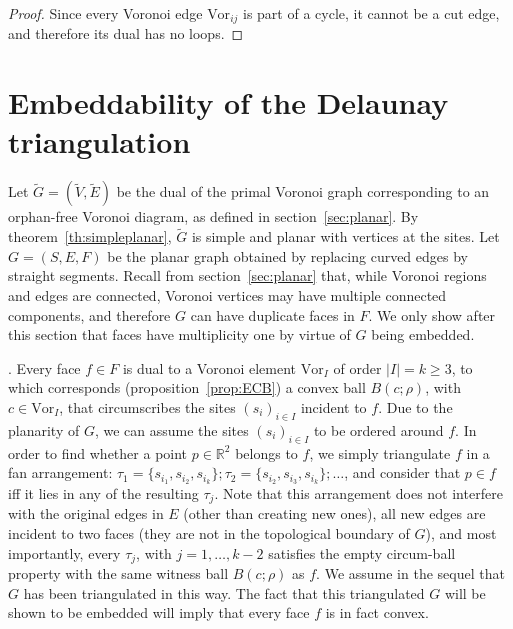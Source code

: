 \documentclass[11pt]{article}
\newcommand{\Sites}{S}
\newcommand{\Vor}{\text{Vor}}
\begin{document}
\begin{proof}
Since every Voronoi edge $\Vor_{ij}$ is part of a cycle, it cannot be a cut edge, and therefore its dual has no loops. 
\end{proof}









\section{Embeddability of the Delaunay triangulation}\label{sec:dual}





Let $\tilde{G}=(\tilde{V}, \tilde{E})$ be the dual of the primal Voronoi graph corresponding to an orphan-free Voronoi diagram, 
	as defined in section~\ref{sec:planar}. 
By theorem~\ref{th:simpleplanar}, $\tilde{G}$ is simple and planar with vertices at the sites. 
Let $G=(\Sites,E,F)$ be the planar graph obtained by replacing curved edges by straight segments. 
Recall from section~\ref{sec:planar} that, 
	while Voronoi regions and edges are connected, Voronoi vertices may have multiple connected components, 
	and therefore $G$ can have duplicate faces in $F$. 
We only show after this section that faces have multiplicity one by virtue of $G$ being embedded. 


\vspace*{0.08in}. 
Every face $f\in F$ is dual to a Voronoi element $\Vor_I$ of order $|I|=k\ge 3$, 
	to which corresponds (proposition~\ref{prop:ECB}) a convex ball $B(c;\rho)$, with $c\in\Vor_I$, 
	that circumscribes the sites $(s_i)_{i\in I}$ incident to $f$. 
Due to the planarity of $G$, we can assume the sites $(s_i)_{i\in I}$ to be ordered around $f$. 
In order to find whether a point $p\in\mathbb{R}^2$ belongs to $f$, 
	we simply triangulate $f$ in a fan arrangement: 
		$\tau_1=\{s_{i_1},s_{i_2},s_{i_k}\}; \tau_2=\{s_{i_2},s_{i_3},s_{i_k}\}; \dots$, 
	and consider that $p\in f$ iff it lies in any of the resulting $\tau_j$. 
Note that this arrangement does not interfere with the original edges in $E$ (other than creating new ones), 
	all new edges are incident to two faces (they are not in the topological boundary of $G$), 
	and most importantly, 
every $\tau_j$, with $j=1,\dots,k-2$ satisfies the empty circum-ball property with the same {witness} ball $B(c;\rho)$ 
	as $f$. 
We assume in the sequel that $G$ has been triangulated in this way. 
The fact that this triangulated $G$ will be shown to be embedded will imply that every face $f$ is in fact convex. 
\end{document}
